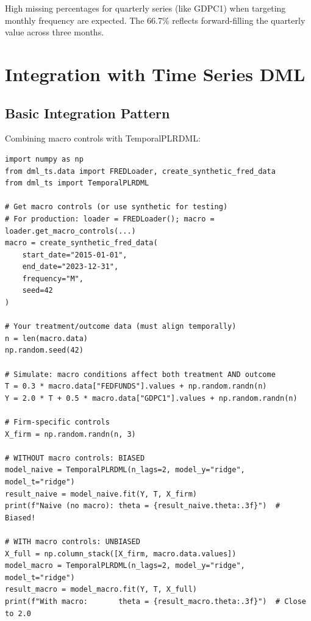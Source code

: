 \begin{remark}
High missing percentages for quarterly series (like GDPC1) when targeting monthly frequency are expected. The 66.7\% reflects forward-filling the quarterly value across three months.
\end{remark}

\section{Integration with Time Series DML}\label{sec:integration_dml}

\subsection{Basic Integration Pattern}

Combining macro controls with TemporalPLRDML:

\begin{verbatim}
import numpy as np
from dml_ts.data import FREDLoader, create_synthetic_fred_data
from dml_ts import TemporalPLRDML

# Get macro controls (or use synthetic for testing)
# For production: loader = FREDLoader(); macro = loader.get_macro_controls(...)
macro = create_synthetic_fred_data(
    start_date="2015-01-01",
    end_date="2023-12-31",
    frequency="M",
    seed=42
)

# Your treatment/outcome data (must align temporally)
n = len(macro.data)
np.random.seed(42)

# Simulate: macro conditions affect both treatment AND outcome
T = 0.3 * macro.data["FEDFUNDS"].values + np.random.randn(n)
Y = 2.0 * T + 0.5 * macro.data["GDPC1"].values + np.random.randn(n)

# Firm-specific controls
X_firm = np.random.randn(n, 3)

# WITHOUT macro controls: BIASED
model_naive = TemporalPLRDML(n_lags=2, model_y="ridge", model_t="ridge")
result_naive = model_naive.fit(Y, T, X_firm)
print(f"Naive (no macro): theta = {result_naive.theta:.3f}")  # Biased!

# WITH macro controls: UNBIASED
X_full = np.column_stack([X_firm, macro.data.values])
model_macro = TemporalPLRDML(n_lags=2, model_y="ridge", model_t="ridge")
result_macro = model_macro.fit(Y, T, X_full)
print(f"With macro:       theta = {result_macro.theta:.3f}")  # Close to 2.0
\end{verbatim}

